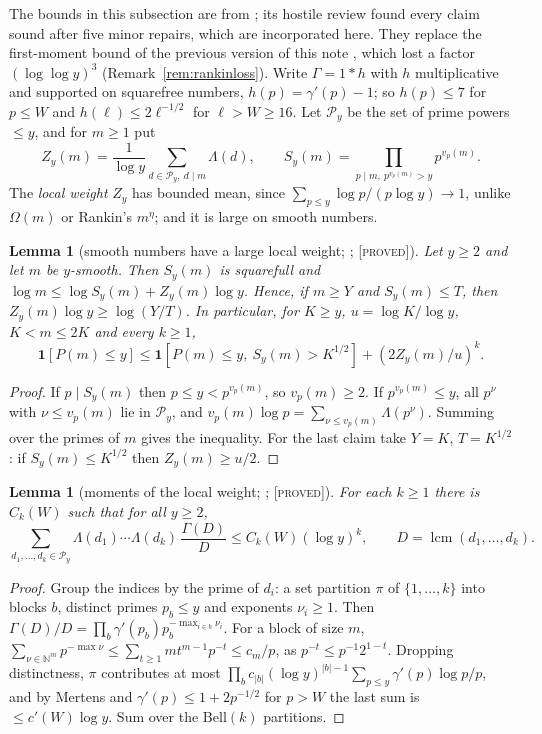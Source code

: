 \documentclass[10pt,reqno]{amsart}
\newtheorem{lemma}[theorem]{Lemma}
\theoremstyle{definition}
\theoremstyle{remark}
\newcommand{\cP}{\mathcal P}
\newcommand{\ind}{\mathbf 1}
\newcommand{\lcm}{\operatorname{lcm}}
\newcommand{\lab}[1]{\textup{[\textsc{#1}]}}
\begin{document}
The bounds in this subsection are from \cite{KA3}; its hostile review
\cite{KA3rev} found every claim sound after five minor repairs, which are
incorporated here.  They replace the first-moment bound of the previous
version of this note \cite[Lemmas~3.1--3.6, Cor.~3.7]{KA2}, which lost a
factor $(\log\log y)^3$ (Remark~\ref{rem:rankinloss}).  Write
$\Gamma=1*h$ with $h$ multiplicative and supported on squarefree numbers,
$h(p)=\gamma'(p)-1$; so $h(p)\leq7$ for $p\leq W$ and $h(\ell)\leq2\ell^{-1/2}$ for
$\ell>W\geq16$.  Let $\cP_y$ be the set of prime powers $\leq y$, and for
$m\geq1$ put
\[
 Z_y(m)=\frac1{\log y}\sum_{d\in\cP_y,\ d\mid m}\Lambda(d),\qquad
 S_y(m)=\prod_{p\mid m,\ p^{v_p(m)}>y}p^{v_p(m)}.
\]
The \emph{local weight} $Z_y$ has bounded mean, since
$\sum_{p\leq y}\log p/(p\log y)\to1$, unlike $\Omega(m)$ or Rankin's $m^\eta$; and it
is large on smooth numbers.

\begin{lemma}[smooth numbers have a large local weight; {\cite[Lemma~2.1, (2.1$'$)]{KA3}}; \lab{proved}]\label{lem:localweight}
Let $y\geq2$ and let $m$ be $y$-smooth.  Then $S_y(m)$ is squarefull and
$\log m\leq\log S_y(m)+Z_y(m)\log y$.  Hence, if $m\geq Y$ and $S_y(m)\leq T$, then
$Z_y(m)\log y\geq\log(Y/T)$.  In particular, for $K\geq y$, $u=\log K/\log y$,
$K<m\leq2K$ and every $k\geq1$,
\[
 \ind[P(m)\leq y]\leq\ind[P(m)\leq y,\ S_y(m)>K^{1/2}]+(2Z_y(m)/u)^k .
\]
\end{lemma}
\begin{proof}
If $p\mid S_y(m)$ then $p\leq y<p^{v_p(m)}$, so $v_p(m)\geq2$.  If
$p^{v_p(m)}\leq y$, all $p^\nu$ with $\nu\leq v_p(m)$ lie in $\cP_y$, and
$v_p(m)\log p=\sum_{\nu\leq v_p(m)}\Lambda(p^\nu)$.  Summing over the primes of
$m$ gives the inequality.  For the last claim take $Y=K$, $T=K^{1/2}$: if
$S_y(m)\leq K^{1/2}$ then $Z_y(m)\geq u/2$.
\end{proof}

\begin{lemma}[moments of the local weight; {\cite[Lemma~2.2]{KA3}}; \lab{proved}]\label{lem:Zmoments}
For each $k\geq1$ there is $C_k(W)$ such that for all $y\geq2$,
\[
 \sum_{d_1,\dots,d_k\in\cP_y}\Lambda(d_1)\cdots\Lambda(d_k)\,\frac{\Gamma(D)}D\leq C_k(W)(\log y)^k,\qquad D=\lcm(d_1,\dots,d_k).
\]
\end{lemma}
\begin{proof}
Group the indices by the prime of $d_i$: a set partition $\pi$ of
$\{1,\dots,k\}$ into blocks $b$, distinct primes $p_b\leq y$ and exponents
$\nu_i\geq1$.  Then $\Gamma(D)/D=\prod_b\gamma'(p_b)p_b^{-\max_{i\in b}\nu_i}$.  For a
block of size $m$,
$\sum_{\nu\in\mathbb N^m}p^{-\max\nu}\leq\sum_{t\geq1}mt^{m-1}p^{-t}\leq c_m/p$, as
$p^{-t}\leq p^{-1}2^{1-t}$.  Dropping distinctness, $\pi$ contributes at most
$\prod_bc_{|b|}(\log y)^{|b|-1}\sum_{p\leq y}\gamma'(p)\log p/p$, and by Mertens and
$\gamma'(p)\leq1+2p^{-1/2}$ for $p>W$ the last sum is $\leq c'(W)\log y$.  Sum over
the $\mathrm{Bell}(k)$ partitions.
\end{proof}
\end{document}
